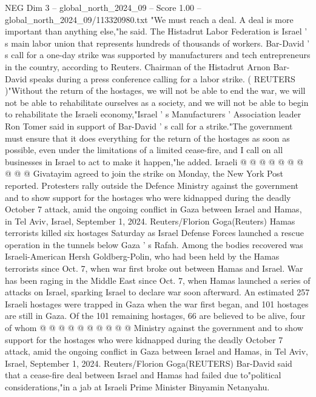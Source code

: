 \begin{textsample}{NEG Dim 3 – global\_north\_2024\_09 – Score 1.00 – global\_north\_2024\_09/113320980.txt}  \label{ex:f3_neg_292}
"We must reach a deal.
A deal is more important than anything else,"he said.
The Histadrut Labor Federation is Israel ' s main labor union that represents hundreds of thousands of workers.
Bar-David ' s call for a one-day strike was supported by manufacturers and tech entrepreneurs in the country, according to Reuters.
Chairman of the Histadrut Arnon Bar-David speaks during a press conference calling for a labor strike. ( REUTERS )"Without the return of the hostages, we will not be able to end the war, we will not be able to rehabilitate ourselves as a society, and we will not be able to begin to rehabilitate the Israeli economy,"Israel ' s Manufacturers ' Association leader Ron Tomer said in support of Bar-David ' s call for a strike."The government must ensure that it does everything for the return of the hostages as soon as possible, even under the limitations of a limited cease-fire, and I call on all businesses in Israel to act to make it happen,"he added.
Israeli @ @ @ @ @ @ @ @ @ @ Givatayim agreed to join the strike on Monday, the New York Post reported.
Protesters rally outside the Defence Ministry against the government and to show support for the hostages who were kidnapped during the deadly October 7 attack, amid the ongoing conflict in Gaza between Israel and Hamas, in Tel Aviv, Israel, September 1, 2024.
Reuters/Florion Goga(Reuters) Hamas terrorists killed six hostages Saturday as Israel Defense Forces launched a rescue operation in the tunnels below Gaza ' s Rafah.
Among the bodies recovered was Israeli-American Hersh Goldberg-Polin, who had been held by the Hamas terrorists since Oct. 7, when war first broke out between Hamas and Israel.
War has been raging in the Middle East since Oct. 7, when Hamas launched a series of attacks on Israel, sparking Israel to declare war soon afterward.
An estimated 257 Israeli hostages were trapped in Gaza when the war first began, and 101 hostages are still in Gaza.
Of the 101 remaining hostages, 66 are believed to be alive, four of whom @ @ @ @ @ @ @ @ @ @ Ministry against the government and to show support for the hostages who were kidnapped during the deadly October 7 attack, amid the ongoing conflict in Gaza between Israel and Hamas, in Tel Aviv, Israel, September 1, 2024.
Reuters/Florion Goga(REUTERS) Bar-David said that a cease-fire deal between Israel and Hamas had failed due to"political considerations,"in a jab at Israeli Prime Minister Binyamin Netanyahu.

\end{textsample}
